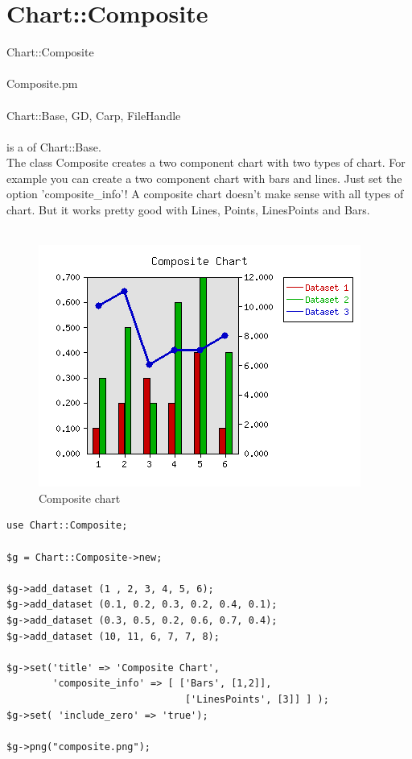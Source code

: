 \section{Chart::Composite}
 Chart::Composite\\ \\
 Composite.pm\\ \\
Chart::Base, GD, Carp, FileHandle\\ \\
  is a  of Chart::Base.\\
The class Composite creates a two component chart with two types of chart. For example you can create a two component chart with bars and lines. Just set the option 'composite\_info'! A composite chart doesn't make sense with all types of chart. But it works pretty good with Lines, Points, LinesPoints and Bars.\\ 
\\
\begin{figure}[h]
	\begin{center}
		\includegraphics[scale=0.6]{composite.png}
	\end{center}
	\caption{Composite chart}
	\label{fig:composite}
\end{figure}
\begin{verbatim}
use Chart::Composite;

$g = Chart::Composite->new;

$g->add_dataset (1 , 2, 3, 4, 5, 6);
$g->add_dataset (0.1, 0.2, 0.3, 0.2, 0.4, 0.1);
$g->add_dataset (0.3, 0.5, 0.2, 0.6, 0.7, 0.4);
$g->add_dataset (10, 11, 6, 7, 7, 8);

$g->set('title' => 'Composite Chart',
        'composite_info' => [ ['Bars', [1,2]],
                               ['LinesPoints', [3]] ] );
$g->set( 'include_zero' => 'true');

$g->png("composite.png");
\end{verbatim}
